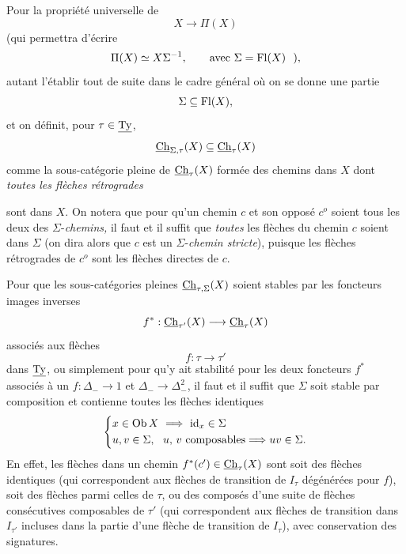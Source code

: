 Pour la propriété universelle de
\[
X \longrightarrow \Pi(X)
\]
(qui permettra d'écrire
\[
\Pi(X) \simeq X\Sigma^{-1}, \qquad \text{avec } \Sigma = \mathrm{Fl}(X) \ \ ),
\]
autant l'établir tout de suite dans le cadre général où on se donne une partie
\[
\Sigma \subseteq \mathrm{Fl}(X),
\]
et on définit, pour $\tau \in \underline{\mathrm{Ty}}$,
\[
\underline{\mathrm{Ch}}_{\Sigma,\tau}(X) \subseteq \underline{\mathrm{Ch}}_{\tau}(X)
\]
comme la sous-catégorie pleine de $\underline{\mathrm{Ch}}_{\tau}(X)$ formée des chemins dans $X$ dont \textit{toutes les flèches rétrogrades}


sont dans $X$. On notera que pour qu'un chemin $c$ et son opposé $c^o$ soient tous les deux des $\Sigma$-\textit{chemins,} il faut et il suffit que \textit{toutes} les flèches du chemin $c$ soient dans $\Sigma$ (on dira alors que $c$ est un $\Sigma$-\textit{chemin stricte}), puisque les flèches rétrogrades de $c^o$ sont les flèches directes de $c$.

Pour que les sous-catégories pleines $\underline{\mathrm{Ch}}_{\tau,\Sigma}(X)$ soient stables par les foncteurs images inverses
\[
f^* : \underline{\mathrm{Ch}}_{\tau'}(X) \longrightarrow \underline{\mathrm{Ch}}_{\tau}(X)
\]
associés aux flèches
\[
f : \tau \longrightarrow \tau'
\]
dans $\underline{\mathrm{Ty}}$, ou simplement pour qu'y ait stabilité pour les deux foncteurs $f^*$ associés à un $f : \Delta_- \longrightarrow 1$ et $\Delta_- \longrightarrow \Delta_-^2$, il faut et il suffit que $\Sigma$ soit stable par composition et contienne toutes les flèches identiques %
\[
\left\{
\begin{aligned}
& x \in \mathrm{Ob}\,X \ \Longrightarrow \ \mathrm{id}_x \in \Sigma \\
& u, v \in \Sigma, \ \ u,\, v \text{ composables} \Longrightarrow uv \in \Sigma.
\end{aligned}
\right.
\]
En effet, les flèches dans un chemin $f^*(c') \in \underline{\mathrm{Ch}}_{\tau}(X)$ sont soit des flèches identiques (qui correspondent aux flèches de transition de $I_\tau$ dégénérées pour $f$), soit des flèches parmi celles de $\tau$, ou des composés d'une suite de flèches consécutives composables de $\tau'$ (qui correspondent aux flèches de transition dans $I_{\tau'}$ incluses dans la partie d'une flèche de transition de $I_\tau$), avec conservation des signatures.



